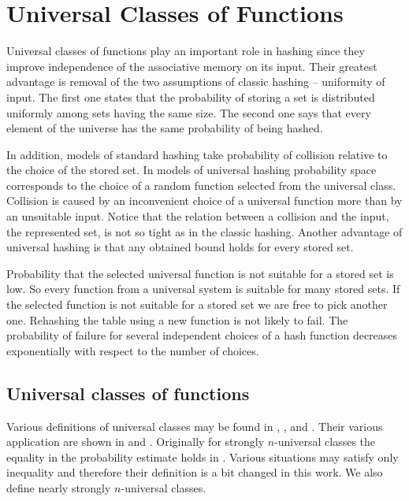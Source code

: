 \chapter{Universal Classes of Functions}
\label{chapter-universal-classes}

Universal classes of functions play an important role in hashing since they improve independence of the associative memory on its input. Their greatest advantage is removal of the two assumptions of classic hashing -- uniformity of input. The first one states that the probability of storing a set is distributed uniformly among sets having the same size. The second one says that every element of the universe has the same probability of being hashed. 

In addition, models of standard hashing take probability of collision relative to the choice of the stored set. In models of universal hashing probability space corresponds to the choice of a random function selected from the universal class. Collision is caused by an inconvenient choice of a universal function more than by an unsuitable input. Notice that the relation between a collision and the input, the represented set, is not so tight as in the classic hashing. Another advantage of universal hashing is that any obtained bound holds for every stored set.

Probability that the selected universal function is not suitable for a stored set is low. So every function from a universal system is suitable for many stored sets. If the selected function is not suitable for a stored set we are free to pick another one. Rehashing the table using a new function is not likely to fail. The probability of failure for several independent choices of a hash function decreases exponentially with respect to the number of choices.

\section{Universal classes of functions}

Various definitions of universal classes may be found in \cite{DBLP:journals/jcss/CarterW79}, \cite{VK-skripta}, \cite{DBLP:books/sp/MehlhornS2008} and \cite{DBLP:books/sp/Mehlhorn84}. Their various application are shown in \cite{1382617} and \cite{Universal-hashing}. Originally for strongly $n$-universal classes the equality in the probability estimate holds in \cite{1382617}. Various situations may satisfy only inequality and therefore their definition is a bit changed in this work. We also define nearly strongly $n$-universal classes.

